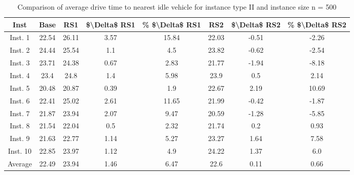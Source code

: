 \begin{table}[H]
\centering
\begin{tabular}{cccccccc}
  \hline
  \textbf{Inst} & \textbf{Base} & \textbf{RS1} & \textbf{\$\textbackslash{}Delta\$  RS1} & \textbf{\% \$\textbackslash{}Delta\$  RS1} & \textbf{RS2} & \textbf{\$\textbackslash{}Delta\$  RS2} & \textbf{\% \$\textbackslash{}Delta\$  RS2} \\\hline
  Inst. 1 & 22.54 & 26.11 & 3.57 & 15.84 & 22.03 & -0.51 & -2.26 \\
  Inst. 2 & 24.44 & 25.54 & 1.1 & 4.5 & 23.82 & -0.62 & -2.54 \\
  Inst. 3 & 23.71 & 24.38 & 0.67 & 2.83 & 21.77 & -1.94 & -8.18 \\
  Inst. 4 & 23.4 & 24.8 & 1.4 & 5.98 & 23.9 & 0.5 & 2.14 \\
  Inst. 5 & 20.48 & 20.87 & 0.39 & 1.9 & 22.67 & 2.19 & 10.69 \\
  Inst. 6 & 22.41 & 25.02 & 2.61 & 11.65 & 21.99 & -0.42 & -1.87 \\
  Inst. 7 & 21.87 & 23.94 & 2.07 & 9.47 & 20.59 & -1.28 & -5.85 \\
  Inst. 8 & 21.54 & 22.04 & 0.5 & 2.32 & 21.74 & 0.2 & 0.93 \\
  Inst. 9 & 21.63 & 22.77 & 1.14 & 5.27 & 23.27 & 1.64 & 7.58 \\
  Inst. 10 & 22.85 & 23.97 & 1.12 & 4.9 & 24.22 & 1.37 & 6.0 \\
  Average & 22.49 & 23.94 & 1.46 & 6.47 & 22.6 & 0.11 & 0.66 \\\hline
\end{tabular}
\caption{Comparison of average drive time to nearest idle vehicle for instance type II and instance size n = 500}
\label{tab:wait:resrelocation-nearest-drive-time-comparison_II_500}
\end{table}
